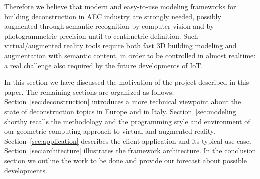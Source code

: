 Therefore we believe that modern and easy-to-use modeling frameworks for building deconstruction in AEC industry are strongly needed, possibly augmented through semantic recognition by computer vision and by photogrammetric precision until to centimetric definition. Such virtual/augmented reality tools require both fast 3D building modeling and augmentation with semantic content, in order to be controlled in almost realtime: a real challenge also required by the future developments of IoT.
 
In this section we have discussed the motivation of the project described in this paper. The remaining sections are organized as follows.
Section~\ref{sec:deconstruction} introduces a more technical viewpoint about the state of deconstruction topics in Europe and in Italy.
Section~\ref{sec:modeling} shorthy recalls the methodology and the programming style and environment of our geometric computing approach to virtual and augmented reality.
Section~\ref{sec:application} describes the client application and its typical use-case. 
Section~\ref{sec:architecture} illustrates the framework architecture. 
In the conclusion section we outline the work to be done and provide our forecast about possible developments.

